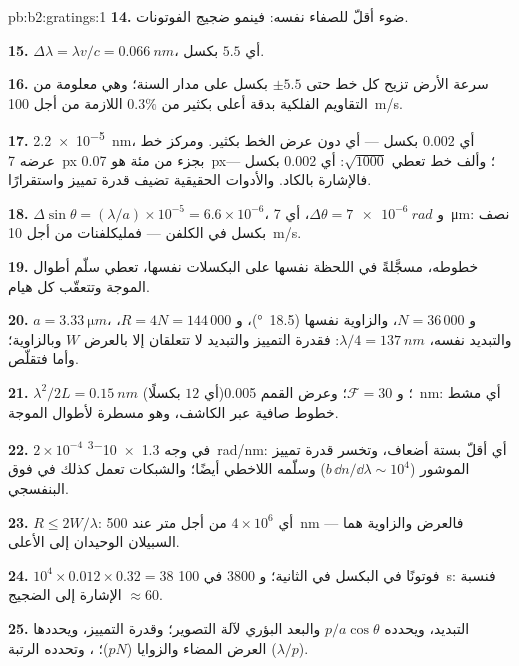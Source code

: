 \begin{solution}{pb:b2:gratings:1}
\textbf{14.} ضوء أقلّ للصفاء نفسه: فينمو ضجيج الفوتونات.

\textbf{15.} $\Delta\lambda = \lambda v/c = \qty{0.066}{nm}$، أي $5.5$ بكسل.

\textbf{16.} سرعة الأرض تزيح كل خط حتى $\pm5.5$
بكسل على مدار السنة؛ وهي معلومة من التقاويم الفلكية بدقة أعلى
بكثير من $0.3\%$ اللازمة من أجل \qty{100}{m/s}.

\textbf{17.} \qty{2.2e-5}{nm}، أي $0.002$ بكسل --- أي دون عرض الخط بكثير. ومركز
خط عرضه \qty{7}{px} بجزء من مئة هو \qty{0.07}{px}؛ وألف
خط تعطي $\sqrt{1000}$: أي $0.002$ بكسل --- فالإشارة بالكاد. والأدوات
الحقيقية تضيف قدرة تمييز واستقرارًا.

\textbf{18.} $\Delta\sin\theta = (\lambda/a) \times 10^{-5} = 6.6 \times 10^{-6}$، و $\Delta\theta = \qty{7e-6}{rad}$،
أي \qty{7}{\micro m}: نصف بكسل في الكلفن --- فمليكلفنات من أجل \qty{10}{m/s}.

\textbf{19.} خطوطه، مسجَّلةً في اللحظة نفسها على البكسلات
نفسها، تعطي سلّم أطوال الموجة وتتعقّب كل هيام.

\textbf{20.} $a = \qty{3.33}{\micro m}$، و $N = 36\,000$، والزاوية نفسها (\qty{18.5}{\degree})، و $R = 4N
= 144\,000$، والتبديد نفسه،  $\lambda/4 = \qty{137}{nm}$: فقدرة التمييز
والتبديد لا تتعلقان إلا بالعرض $W$ وبالزاوية؛ وأما 
فتقلّص.

\textbf{21.}  $\lambda^2/2L = \qty{0.15}{nm}$ (أي $12$ بكسلًا)؛ و $\mathcal F = 30$؛ وعرض القمم
\qty{0.005}{nm}: أي مشط خطوط صافية عبر الكاشف، وهو
مسطرة لأطوال الموجة.

\textbf{22.} $2 \times 10^{-4}$ في وجه \qty{1.3e-3}{rad/nm}: أي أقلّ بستة أضعاف، وتخسر
قدرة تمييز الموشور ($b\,\dd n/\dd\lambda \sim 10^4$) وسلّمه اللاخطي
أيضًا؛ والشبكات تعمل كذلك في فوق البنفسجي.

\textbf{23.} $R \le 2W/\lambda$: أي $4 \times 10^6$ من أجل متر عند \qty{500}{nm} --- فالعرض
والزاوية هما السبيلان الوحيدان إلى الأعلى.

\textbf{24.} $10^4 \times 0.012 \times 0.32 = 38$ فوتونًا في البكسل في الثانية؛ و $3800$
في \qty{100}{s}: فنسبة الإشارة إلى الضجيج $\approx 60$.

\textbf{25.} التبديد، ويحدده $p/a\cos\theta$ والبعد البؤري لآلة التصوير؛
وقدرة التمييز، ويحددها العرض المضاء والزوايا ($pN$)؛
، وتحدده الرتبة ($\lambda/p$).
\end{solution}

